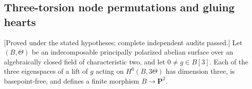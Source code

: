 \subsection{Three-torsion node permutations and gluing hearts}

\begin{lemma}
\label{lem:nonproduct-three-theta-finite-eigenmaps-candidate}
\textup{[Proved under the stated hypotheses; complete independent audits passed.]}
Let $(B,\Theta)$ be an indecomposable principally polarized abelian
surface over an algebraically closed field of characteristic two,
and let $0\ne g\in B[3]$. Each of the three eigenspaces of a lift
of $g$ acting on $H^0(B,3\Theta)$ has dimension three, is
basepoint-free, and defines a finite morphism $B\to\mathbf P^2$.
\end{lemma}
